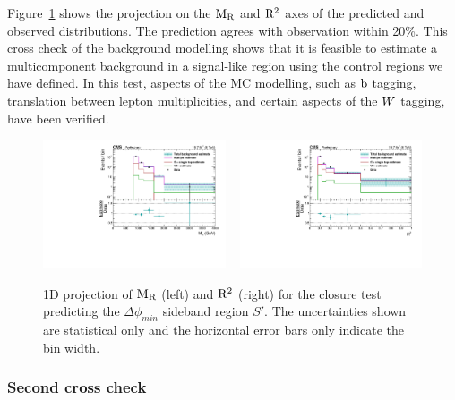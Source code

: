 Figure~\ref{fig:Shape_syst_1D_project_sideband} shows the projection on the $\mathrm{M_R}$ and $\mathrm{R^2}$ axes of
the predicted and observed distributions.  The prediction agrees with observation within 20\%.  This
cross check of the background modelling shows that it is feasible to estimate a multicomponent 
background in a signal-like region using the control regions we have defined.
In this test, aspects of the MC modelling, such as $\mathrm{b}$ tagging, translation between lepton 
multiplicities, and certain aspects of the $W$ tagging, have been verified. 

\begin{figure}[htpb]
\includegraphics[width=0.48\textwidth]
{figures/razor_selection/MR_comparison_data_estimate_g1Mbg1W0Ll_mdPhi0p5_log}
~
\includegraphics[width=0.48\textwidth]
{figures/razor_selection/R2_comparison_data_estimate_g1Mbg1W0Ll_mdPhi0p5_log}
\caption{1D projection of $\mathrm{M_R}$ (left) and $\mathrm{R^2}$ (right) for the closure test predicting the
$\Delta\phi_{min}$ sideband region $S'$. The uncertainties shown are statistical only and the
horizontal error bars only indicate the bin width.
\label{fig:Shape_syst_1D_project_sideband}}
\end{figure}


\subsubsection{Second cross check}

